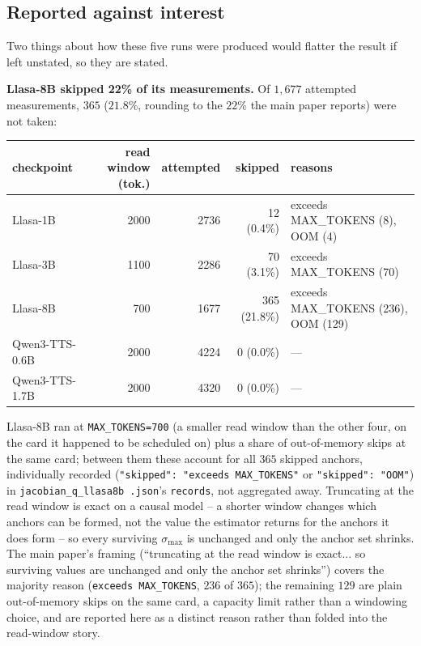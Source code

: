 \documentclass[11pt]{article}
\begin{document}
\subsection{Reported against interest}
\label{sec:s5-jacobian-flags}

Two things about how these five runs were produced would flatter the result if
left unstated, so they are stated.

\noindent\textbf{Llasa-8B skipped 22\% of its measurements.} Of $1{,}677$
attempted measurements, $365$ ($21.8\%$, rounding to the $22\%$ the main paper
reports) were not taken:

\begin{center}
\begin{tabular}{@{}lrrrp{4.6cm}@{}}
\toprule
checkpoint & read window (tok.) & attempted & skipped & reasons \\
\midrule
Llasa-1B & 2000 & 2736 & 12 (0.4\%) & exceeds MAX\_TOKENS (8), OOM (4) \\
Llasa-3B & 1100 & 2286 & 70 (3.1\%) & exceeds MAX\_TOKENS (70) \\
Llasa-8B & 700 & 1677 & 365 (21.8\%) & exceeds MAX\_TOKENS (236), OOM (129) \\
Qwen3-TTS-0.6B & 2000 & 4224 & 0 (0.0\%) & --- \\
Qwen3-TTS-1.7B & 2000 & 4320 & 0 (0.0\%) & --- \\
\bottomrule
\end{tabular}
\end{center}

Llasa-8B ran at \texttt{MAX\_TOKENS=700} (a smaller read window than the other
four, on the card it happened to be scheduled on) plus a share of
out-of-memory skips at the same card; between them these account for all $365$
skipped anchors, individually recorded (\texttt{"skipped": "exceeds
MAX\_TOKENS"} or \texttt{"skipped": "OOM"}) in \texttt{jacobian\_q\_llasa8b
.json}'s \texttt{records}, not aggregated away. Truncating at the read window
is exact on a causal model -- a shorter window changes which anchors can be
formed, not the value the estimator returns for the anchors it does form -- so
every surviving $\sigma_{\max}$ is unchanged and only the anchor set shrinks.
The main paper's framing (``truncating at the read window is exact... so
surviving values are unchanged and only the anchor set shrinks'') covers the
majority reason (\texttt{exceeds MAX\_TOKENS}, $236$ of $365$); the remaining
$129$ are plain out-of-memory skips on the same card, a capacity limit rather
than a windowing choice, and are reported here as a distinct reason rather
than folded into the read-window story.
\end{document}
